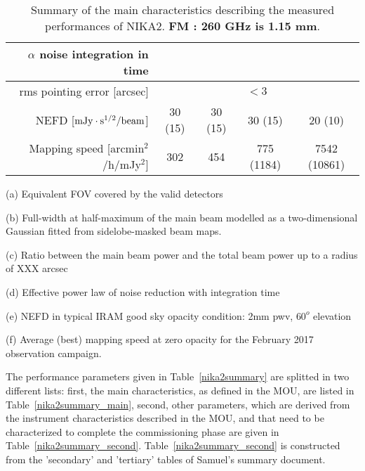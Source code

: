 \begin{table}[h]
\begin{center}
\begin{threeparttable}
\begin{tabular}{|r|c|c|c|c|}
      $\alpha$ noise integration in time\tnote{d}\hspace{1mm}  &   &   &   &  \\
      \hline
      rms pointing error    [arcsec]    & \multicolumn{4}{|c|}{$<3$}  \\
      \hline
      NEFD\tnote{e}\hspace{1mm}   [$\rm{mJy} \cdot \rm{s}^{1/2}/\rm{beam}$]  &  30 (15)   & 30 (15)  &  30 (15)  & 20 (10) \\
      Mapping speed\tnote{f}\hspace{1mm} [arcmin$^2$/h/mJy$^2$] & 302  & 454  & 775 (1184)  & 7542 (10861)  \\
\hline

\end{tabular}
  \begin{tablenotes}
{\small     
  \item[(a)] Equivalent FOV covered by the valid detectors
  \item[(b)] Full-width at half-maximum of the main beam modelled as a two-dimensional Gaussian fitted from sidelobe-masked beam maps.
  \item[(c)]  Ratio between the main beam power and the total beam power up to a radius of XXX arcsec
  \item[(d)] Effective power law of noise reduction with integration time
  \item[(e)] NEFD in typical IRAM good sky opacity condition: 2mm pwv, $60^o$ elevation
  \item[(f)] Average (best) mapping speed at zero opacity for the February 2017 observation campaign. 
}
  \end{tablenotes}
\end{threeparttable}
\caption{Summary of the main characteristics describing the measured 
performances of NIKA2. {\bf FM : 260 GHz is 1.15 mm}.}
\label{tab:nika2summary}
\end{center}  
\end{table}


The performance parameters given in Table~\ref{nika2summary} are splitted in two different lists: first, the main characteristics, as defined in the MOU, are listed in Table~\ref{nika2summary_main}, second, other parameters, which are derived from the instrument characteristics described in the MOU, and that need to be characterized to complete the commissioning phase are given in Table~\ref{nika2summary_second}. Table~\ref{nika2summary_second} is constructed from the 'secondary' and 'tertiary' tables of Samuel's summary document. 

